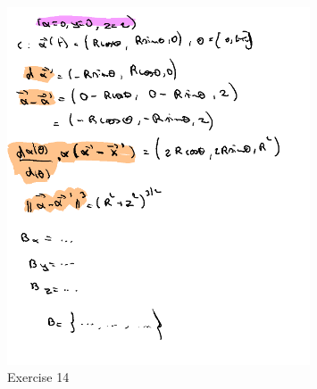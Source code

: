 \documentclass[a4paper]{article}
\begin{document}
\begin{figure}[H]
	\centering
	\includegraphics[width=0.8\textwidth]{assets/2024-11-10-11-45-23.png}
	\caption{Exercise 14}
	\label{fig:2024-11-10-11-45-23}
\end{figure}
\end{document}
